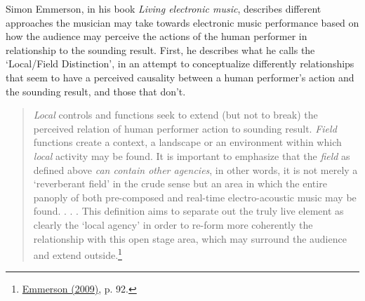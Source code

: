 Simon Emmerson, in his book \emph{Living electronic music}, describes different approaches the musician may take towards electronic music performance based on how the audience may perceive the actions of the human performer in relationship to the sounding result. First, he describes what he calls the `Local/Field Distinction', in an attempt to conceptualize differently relationships that seem to have a perceived causality between a human performer's action and the sounding result, and those that don't.
\begin{quote}
\emph{Local} controls and functions seek to extend (but not to break) the perceived relation of human performer action to sounding result. \emph{Field} functions create a context, a landscape or an environment within which \emph{local} activity may be found. It is important to emphasize that the \emph{field} as defined above \emph{can contain other agencies}, in other words, it is not merely a `reverberant field' in the crude sense but an area in which the entire panoply of both pre-composed and real-time electro-acoustic music may be found. . . . This definition aims to separate out the truly live element as clearly the `local agency' in order to re-form more coherently the relationship with this open stage area, which may surround the audience and extend outside.\footnote {\hyperlink{emmersonliving}{Emmerson (2009)}, p. 92.}
\end{quote}
